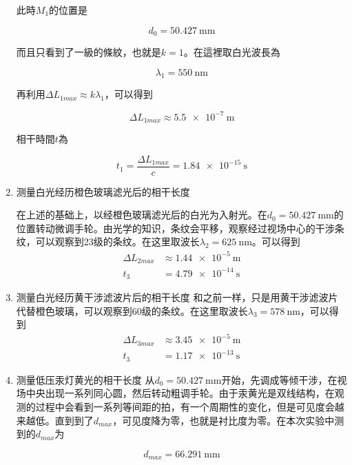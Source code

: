\documentclass[a4paper]{article}
\begin{document}
\begin{changemargin}{1cm}{1cm}
\begin{spacing}{1.6}
\begin{enumerate}
                  此時$M_1$的位置是

                  $$d_0=\SI{50.427}{\mm}$$

                  而且只看到了一級的條紋，也就是$k=1$。在這裡取白光波長為

                  $$\lambda_1=\SI{550}{\nm}$$

                  再利用$\Delta L_{1max}\approx k \lambda_1$，可以得到

                  $$\Delta L_{1max} \approx \SI{5.5e-7}{\m}$$

                  相干時間$t$為

                  $$t_1=\frac{\Delta L_{1max}}{c}=\SI{1.84e-15}{\s}$$

            \item 测量白光经历橙色玻璃滤光后的相干长度

                  在上述的基础上，以经橙色玻璃滤光后的白光为入射光。在$d_0=\SI{50.427}{\mm}$的位置转动微调手轮。由光学的知识，条纹会平移，观察经过视场中心的干涉条纹，可以观察到23级的条纹。在这里取波长$\lambda_2=\SI{625}{\nm}$。可以得到
                  $$\begin{aligned}
                          \Delta L_{2max} & \approx \SI{1.44e-5}{\m} \\
                          t_3             & =\SI{4.79e-14}{\s}
                      \end{aligned}$$

            \item 测量白光经历黄干涉滤波片后的相干长度
                  和之前一样，只是用黄干涉滤波片代替橙色玻璃，可以观察到60级的条纹。在这里取波长$\lambda_3=\SI{578}{\nm}$，可以得到
                  $$\begin{aligned}
                          \Delta L_{3max} & \approx \SI{3.45e-5}{\m} \\
                          t_3             & =\SI{1.17e-13}{\s}
                      \end{aligned}$$

            \item 测量低压汞灯黄光的相干长度
                  从$d_0=\SI{50.427}{\mm}$开始，先调成等倾干涉，在视场中央出现一系列同心圆，然后转动粗调手轮。由于汞黄光是双线结构，在观测的过程中会看到一系列等间距的拍，有一个周期性的变化，但是可见度会越来越低。直到到了$d_{max}$，可见度降为零，也就是衬比度为零。在本次实验中测到的$d_{max}$为

                  $$ d_{max}=\SI{66.291}{\mm}$$


\end{enumerate}
\end{spacing}
\end{changemargin}
\end{document}

